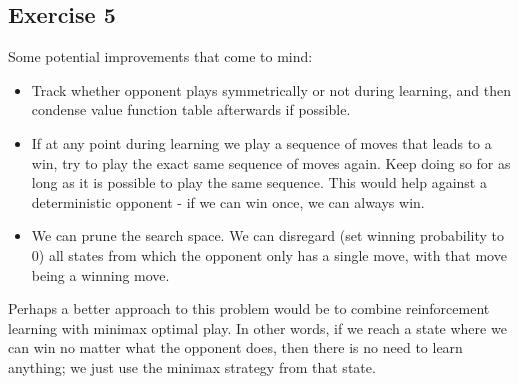 \subsection{Exercise 5}
Some potential improvements that come to mind:
\begin{itemize}
        \item Track whether opponent plays symmetrically or not during learning, and then condense value 
                function table afterwards if possible.
        \item If at any point during learning we play a sequence of moves that leads to a win, try to play
                the exact same sequence of moves again. Keep doing so for as long as it is possible to play
                the same sequence. This would help against a deterministic opponent - if we can win once, we
                can always win.
        \item We can prune the search space. We can disregard (set winning probability to 0) 
                all states from which the opponent only has a single move, with that move being a winning move.
\end{itemize}

Perhaps a better approach to this problem would be to combine reinforcement learning with minimax optimal
play. In other words, if we reach a state where we can win no matter what the opponent does, then there is
no need to learn anything; we just use the minimax strategy from that state. 
